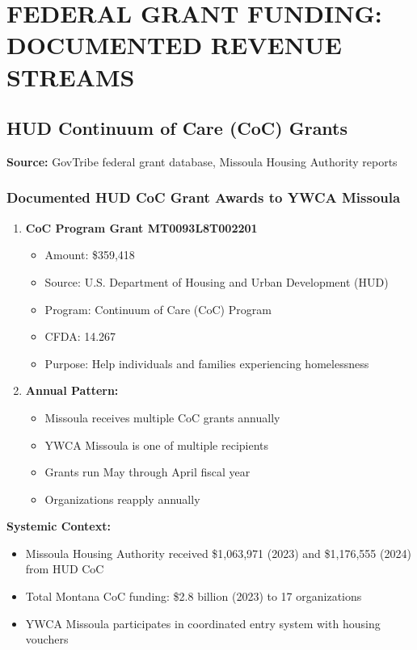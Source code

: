 \documentclass[11pt,letterpaper]{article}
\begin{document}
\section{FEDERAL GRANT FUNDING: DOCUMENTED REVENUE STREAMS}

\subsection{HUD Continuum of Care (CoC) Grants}

\textbf{Source:} GovTribe federal grant database, Missoula Housing Authority reports

\subsubsection{Documented HUD CoC Grant Awards to YWCA Missoula}

\begin{enumerate}[leftmargin=*]
\item \textbf{CoC Program Grant MT0093L8T002201}
\begin{itemize}
\item Amount: \$359,418
\item Source: U.S. Department of Housing and Urban Development (HUD)
\item Program: Continuum of Care (CoC) Program
\item CFDA: 14.267
\item Purpose: Help individuals and families experiencing homelessness
\end{itemize}

\item \textbf{Annual Pattern:}
\begin{itemize}
\item Missoula receives multiple CoC grants annually
\item YWCA Missoula is one of multiple recipients
\item Grants run May through April fiscal year
\item Organizations reapply annually
\end{itemize}
\end{enumerate}

\textbf{Systemic Context:}
\begin{itemize}[leftmargin=*]
\item Missoula Housing Authority received \$1,063,971 (2023) and \$1,176,555 (2024) from HUD CoC
\item Total Montana CoC funding: \$2.8 billion (2023) to 17 organizations
\item YWCA Missoula participates in coordinated entry system with housing vouchers
\end{itemize}
\end{document}
